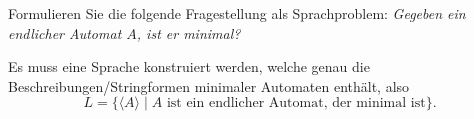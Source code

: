 Formulieren Sie die folgende Fragestellung als Sprachproblem:
{\em 
Gegeben ein endlicher Automat $A$, ist er minimal?
}


\begin{loesung}
Es muss eine Sprache konstruiert werden, welche genau die
Beschreibungen/Stringformen
minimaler Automaten enthält, also
\[
L
=
\{
\langle A\rangle
\mid
\text{$A$ ist ein endlicher Automat, der minimal ist}
\}.
\]
\end{loesung}
